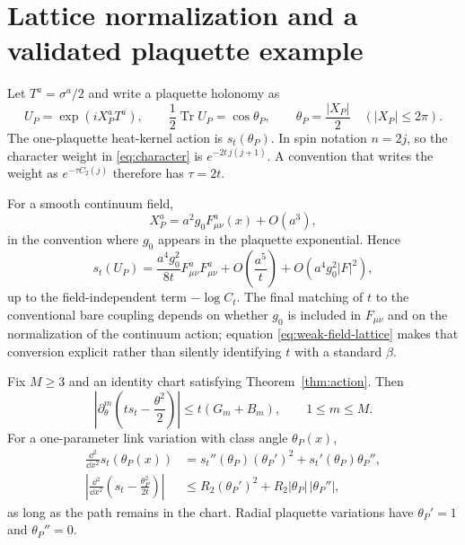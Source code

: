 \section{Lattice normalization and a validated plaquette example}\label{sec:applications}

Let $T^a=\sigma^a/2$ and write a plaquette holonomy as
\[
 U_P=\exp(iX_P^aT^a),\qquad
 \frac12\operatorname{Tr}U_P=\cos\theta_P,\qquad
 \theta_P=\frac{|X_P|}{2}\quad (|X_P|\le2\pi).
\]
The one-plaquette heat-kernel action is $s_t(\theta_P)$.  In spin notation
$n=2j$, so the character weight in \eqref{eq:character} is
$e^{-2t\,j(j+1)}$.  A convention that writes the weight as
$e^{-\tau C_2(j)}$ therefore has $\tau=2t$.

For a smooth continuum field,
\[
 X_P^a=a^2g_0F_{\mu\nu}^a(x)+O(a^3),
\]
in the convention where $g_0$ appears in the plaquette exponential.  Hence
\begin{equation}\label{eq:weak-field-lattice}
 s_t(U_P)=\frac{a^4g_0^2}{8t}F_{\mu\nu}^aF_{\mu\nu}^a
+O\!\left(\frac{a^5}{t}\right)+O(a^4g_0^2|F|^2),
\end{equation}
up to the field-independent term $-\log C_t$.  The final matching of $t$ to
the conventional bare coupling depends on whether $g_0$ is included in
$F_{\mu\nu}$ and on the normalization of the continuum action; equation
\eqref{eq:weak-field-lattice} makes that conversion explicit rather than
silently identifying $t$ with a standard $\beta$.

\begin{corollary}\label{cor:lattice}
Fix $M\ge3$ and an identity chart satisfying
Theorem~\ref{thm:action}.  Then
\begin{equation}\label{eq:scaledbudget}
 \left|\partial_\theta^m\left(ts_t-\frac{\theta^2}{2}\right)\right|
 \le t(G_m+B_m),\qquad 1\le m\le M.
\end{equation}
For a one-parameter link variation with class angle $\theta_P(x)$,
\begin{align}
 \frac{\dd^2}{\dd x^2}s_t(\theta_P(x))
 &=s_t''(\theta_P)(\theta_P')^2+s_t'(\theta_P)\theta_P'',\label{eq:link-chain}\\
 \left|\frac{\dd^2}{\dd x^2}
 \left(s_t-\frac{\theta_P^2}{2t}\right)\right|
 &\le R_2(\theta_P')^2+R_2|\theta_P|\,|\theta_P''|,\label{eq:link-chain-bound}
\end{align}
as long as the path remains in the chart.  Radial plaquette variations have
$\theta_P'=1$ and $\theta_P''=0$.
\end{corollary}


